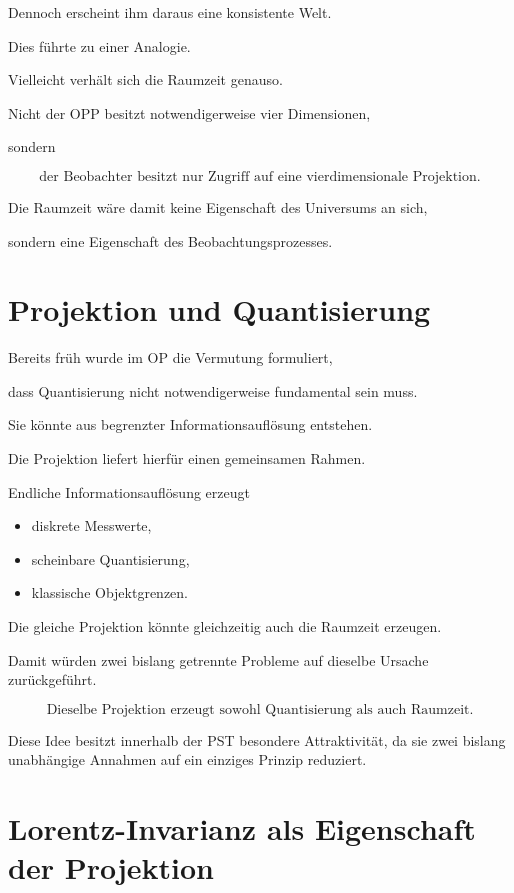 Dennoch erscheint ihm daraus eine konsistente Welt.

Dies führte zu einer Analogie.

Vielleicht verhält sich die Raumzeit genauso.

Nicht der OPP besitzt notwendigerweise vier Dimensionen,

sondern

\[
\boxed{
\text{der Beobachter besitzt nur Zugriff auf eine vierdimensionale Projektion.}
}
\]

Die Raumzeit wäre damit keine Eigenschaft des Universums an sich,

sondern eine Eigenschaft des Beobachtungsprozesses.

\section*{Projektion und Quantisierung}

Bereits früh wurde im OP die Vermutung formuliert,

dass Quantisierung nicht notwendigerweise fundamental sein muss.

Sie könnte aus begrenzter Informationsauflösung entstehen.

Die Projektion liefert hierfür einen gemeinsamen Rahmen.

Endliche Informationsauflösung erzeugt

\begin{itemize}

\item diskrete Messwerte,

\item scheinbare Quantisierung,

\item klassische Objektgrenzen.

\end{itemize}

Die gleiche Projektion könnte gleichzeitig auch die Raumzeit erzeugen.

Damit würden zwei bislang getrennte Probleme auf dieselbe Ursache zurückgeführt.

\[
\boxed{
\text{Dieselbe Projektion erzeugt sowohl Quantisierung als auch Raumzeit.}
}
\]

Diese Idee besitzt innerhalb der PST besondere Attraktivität, da sie zwei bislang unabhängige Annahmen auf ein einziges Prinzip reduziert.

\section*{Lorentz-Invarianz als Eigenschaft der Projektion}


